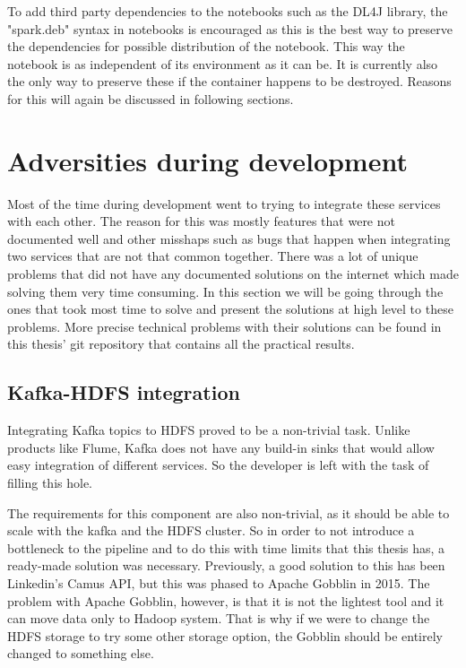 To add third party dependencies to the notebooks such as the DL4J library, the "spark.deb" syntax in notebooks is encouraged as this is the best way to preserve the dependencies for possible distribution of the notebook.
This way the notebook is as independent of its environment as it can be.
It is currently also the only way to preserve these if the container happens to be destroyed. 
Reasons for this will again be discussed in following sections.

\section{Adversities during development}

Most of the time during development went to trying to integrate these services with each other.
The reason for this was mostly features that were not documented well and other misshaps such as bugs that happen when integrating two services that are not that common together.
There was a lot of unique problems that did not have any documented solutions on the internet which made solving them very time consuming.
In this section we will be going through the ones that took most time to solve and present the solutions at high level to these problems.
More precise technical problems with their solutions can be found in this thesis' git repository that contains all the practical results.

\subsection{Kafka-HDFS integration}

Integrating Kafka topics to HDFS proved to be a non-trivial task.
Unlike products like Flume, Kafka does not have any build-in sinks that would allow easy integration of different services.
So the developer is left with the task of filling this hole.

The requirements for this component are also non-trivial, as it should be able to scale with the kafka and the HDFS cluster.
So in order to not introduce a bottleneck to the pipeline and to do this with time limits that this thesis has, a ready-made solution was necessary.
Previously, a good solution to this has been Linkedin's Camus API, but this was phased to Apache Gobblin in 2015. 
The problem with Apache Gobblin, however, is that it is not the lightest tool and it can move data only to Hadoop system.
That is why if we were to change the HDFS storage to try some other storage option, the Gobblin should be entirely changed to something else.

